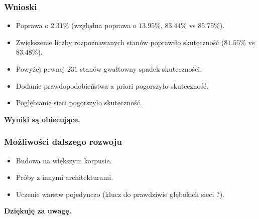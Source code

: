 \documentclass[mathserif, serif]{beamer}
\begin{document}
	\begin{frame}
		\frametitle{Wnioski}
		
		\begin{itemize}
			\item Poprawa o $2.31\%$ (względna poprawa o $13.95\%$, $83.44\%$ vs $85.75\%$).
			\item Zwiększenie liczby rozpoznawanych stanów poprawiło skuteczność ($81.55\%$ vs $83.48\%$).
			\item Powyżej pewnej $231$ stanów gwałtowny spadek skuteczności.
			\item Dodanie prawdopodobieństwa a priori pogorszyło skuteczność.
			\item Pogłębianie sieci pogorszyło skuteczność.
		\end{itemize}
	
	\begin{exampleblock}{}
		\textbf{Wyniki są obiecujące.}
	\end{exampleblock}
	
	\end{frame}

	\begin{frame}
		\frametitle{Możliwości dalszego rozwoju}
		
		\begin{itemize}
			\item Budowa na większym korpusie.
			\item Próby z innymi architekturami.
			\item Uczenie warstw pojedynczo (klucz do prawdziwie głębokich sieci ?).
		\end{itemize}
	\end{frame}

\begin{frame}
	\huge
	\begin{exampleblock}{}
		\textbf{Dziękuję za uwagę.}
	\end{exampleblock}

\end{frame}
\end{document}
